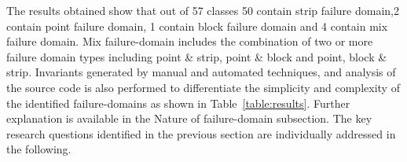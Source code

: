 The results obtained show that out of 57 classes 50 contain strip failure domain,2 contain point failure domain, 1 contain block failure domain and 4 contain mix failure domain. Mix failure-domain includes the combination of two or more failure domain types including point \& strip, point \& block and point, block \& strip. Invariants generated by manual and automated techniques, and analysis of the source code is also performed to differentiate the simplicity and complexity of the identified failure-domains as shown in Table~\ref{table:results}. Further explanation is available in the Nature of failure-domain subsection. The key research questions identified in the previous section are individually addressed in the following.







